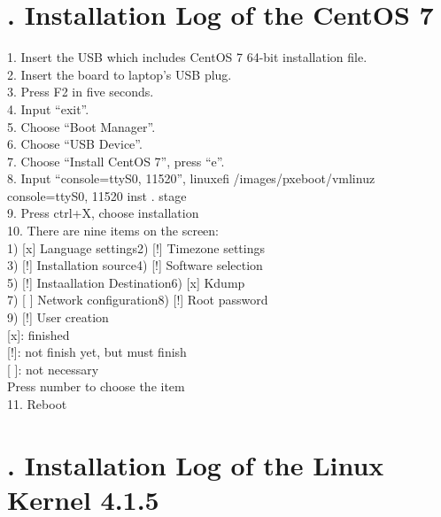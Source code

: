 \documentclass[11pt,draftclsnofoot,onecolumn,letterpaper]{IEEEtran}
\newcommand{\tab}{\hspace*{2em}}
\begin{document}
\newpage

\section*{\large{\uppercase\expandafter{}. Installation Log of the CentOS 7}}

1.  Insert the USB which includes CentOS 7 64-bit installation file.\\
2.  Insert the board to laptop’s USB plug.\\
3.  Press F2 in five seconds.\\
4.  Input “exit”. \\
5.  Choose “Boot Manager”. \\
6.  Choose “USB Device”.\\
7.  Choose “Install CentOS 7”, press “e”.\\
8.  Input “console=ttyS0, 11520”, linuxefi /images/pxeboot/vmlinuz console=ttyS0, 11520 inst . stage \\
9.  Press ctrl+X, choose installation\\
10. There are nine items on the screen:\\
\tab 1) [x] Language settings\tab\tab   2) [!] Timezone settings\\
\tab 3) [!] Installation source\tab\tab 4) [!] Software selection\\
\tab 5) [!] Instaallation Destination\tab   6) [x] Kdump\\
\tab 7) [ ] Network configuration\tab   8) [!] Root password\\
\tab 9) [!] User creation\\
\tab [x]: finished\\
\tab [!]: not finish yet, but must finish\\
\tab [ ]: not necessary \\
\tab Press number to choose the item\\
11. Reboot

\section*{\large{\uppercase\expandafter{}. Installation Log of the Linux Kernel 4.1.5}}
\end{document}
